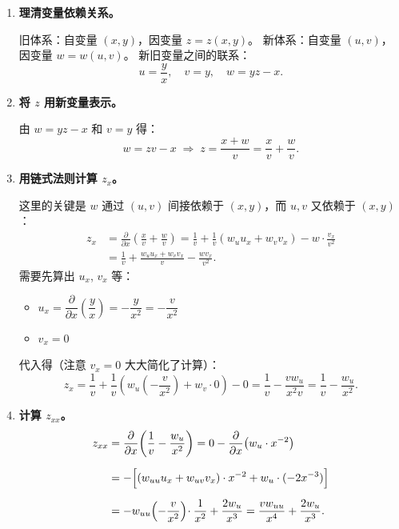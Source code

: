 \documentclass[lang=cn,11pt]{elegantbook}
\begin{document}
\begin{solution}
\begin{enumerate}
  \item \textbf{理清变量依赖关系。}
  
  旧体系：自变量 $(x,y)$，因变量 $z=z(x,y)$。
  新体系：自变量 $(u,v)$，因变量 $w=w(u,v)$。
  新旧变量之间的联系：
  \[
  u=\frac{y}{x},\quad v=y,\quad w=yz-x.
  \]

  \item \textbf{将 $z$ 用新变量表示。}
  
  由 $w=yz-x$ 和 $v=y$ 得：
  \[
  w=zv-x\;\Longrightarrow\;z=\frac{x+w}{v}=\frac{x}{v}+\frac{w}{v}.
  \]

  \item \textbf{用链式法则计算 $z_x$。}
  
  这里的关键是 $w$ 通过 $(u,v)$ 间接依赖于 $(x,y)$，而 $u,v$ 又依赖于 $(x,y)$：
  \begin{align*}
  z_x&=\frac{\partial}{\partial x}\!\left(\frac{x}{v}+\frac{w}{v}\right)
  =\frac{1}{v}+\frac{1}{v}(w_u u_x+w_v v_x)-w\cdot\frac{v_x}{v^2}\\[6pt]
  &=\frac{1}{v}+\frac{w_u u_x+w_v v_x}{v}-\frac{wv_x}{v^2}.
  \end{align*}
  需要先算出 $u_x$, $v_x$ 等：
  \begin{itemize}
      \item $u_x=\dfrac{\partial}{\partial x}\!\left(\dfrac{y}{x}\right)=-\dfrac{y}{x^2}=-\dfrac{v}{x^2}$
      \item $v_x=0$
  \end{itemize}
  代入得（注意 $v_x=0$ 大大简化了计算）：
  \[
  z_x=\frac{1}{v}+\frac{1}{v}\!\left(w_u\!\left(-\frac{v}{x^2}\right)+w_v\cdot 0\right)-0
  =\frac{1}{v}-\frac{vw_u}{x^2v}=\frac{1}{v}-\frac{w_u}{x^2}.
  \]

  \item \textbf{计算 $z_{xx}$。}
  \begin{align*}
  z_{xx}&=\frac{\partial}{\partial x}\!\left(\frac{1}{v}-\frac{w_u}{x^2}\right)
  =0-\frac{\partial}{\partial x}\!\left(w_u\cdot x^{-2}\right)\\[6pt]
  &=-\Bigl[(w_{uu}u_x+w_{uv}v_x)\cdot x^{-2}+w_u\cdot(-2x^{-3})\Bigr]\\[6pt]
  &=-w_{uu}\!\left(-\frac{v}{x^2}\right)\!\cdot\frac{1}{x^2} +\frac{2w_u}{x^3}
  =\frac{vw_{uu}}{x^4}+\frac{2w_u}{x^3}.
  \end{align*}


\end{enumerate}
\end{solution}
\end{document}
